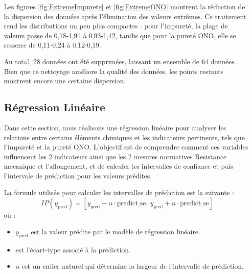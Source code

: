 \documentclass[12pt]{article}
\begin{document}
Les figures \ref{fig:ExtremeImpurete} et \ref{fig:ExtremeONO} 
montrent la réduction de la dispersion des données après 
l'élimination des valeurs extrêmes. Ce traitement rend les distributions 
un peu plus compactes : pour l'impureté, la plage de valeurs passe 
de 0,78-1,91 à 0,93-1,42, tandis que pour la pureté ONO, elle se 
resserre de 0,11-0,24 à 0,12-0,19.

Au total, 28 données ont été supprimées, laissant un ensemble de 
64 données. Bien que ce nettoyage améliore la qualité des données, les 
points restants montrent encore une certaine dispersion. 






\subsection{Régression Linéaire}



Dans cette section, nous réalisons une régression linéaire pour analyser 
les relations entre certains éléments chimiques et les indicateurs 
pertinents, tels que l'impureté et la pureté ONO. L'objectif est de 
comprendre comment ces variables influencent les 2 indicateurs ainsi que 
les 2 mesures normatives Resistance mecanique et l'allongement, 
et de calculer les intervalles  de confiance et puis l'intervale 
de prédiction pour les valeurs prédites.

\medskip %

La formule utilisée pour calculer les intervalles de prédiction est la suivante :
$$
IP (y_{\text{pred}}) = [y_{\text{pred}} - n \cdot \text{predict\_se}, \, y_{\text{pred}} + n \cdot \text{predict\_se}]
$$
où :
\begin{itemize}
    \item $y_{\text{pred}}$ est la valeur prédite par le modèle de 
    régression linéaire.
    \item {} est l'écart-type associé à la prédiction.
    \item $n$ est un entier naturel qui détermine la largeur de 
    l'intervalle de prédiction.
\end{itemize}


\end{document}
